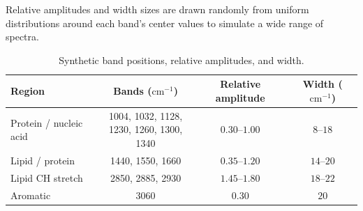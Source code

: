 Relative amplitudes and width sizes are drawn randomly from uniform distributions around each band's center values to simulate a wide range of spectra.


\begin{table}[H]
\centering
\small
\begin{tabular*}{\textwidth}{@{\extracolsep{\fill}}lccc}
\toprule
Region & Bands ($\text{cm}^{-1}$) & Relative amplitude & Width ($\text{cm}^{-1}$) \\
\midrule
Protein / nucleic acid & \makecell{1004, 1032, 1128,\\ 1230, 1260, 1300, 1340} & $0.30$--$1.00$ & $8$--$18$ \\
\midrule
Lipid / protein & 1440, 1550, 1660 & $0.35$--$1.20$ & $14$--$20$ \\
\midrule
Lipid CH stretch & 2850, 2885, 2930 & $1.45$--$1.80$ & $18$--$22$ \\
\midrule
Aromatic & 3060 & $0.30$ & $20$ \\
\bottomrule
\end{tabular*}
\caption{\small Synthetic band positions, relative amplitudes, and width.}
\label{tab:baseline_generator_bands}
\end{table}


